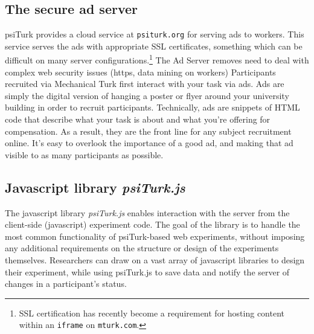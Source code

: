 \documentclass[twocolumn]{svjour3}          %
\begin{document}
\subsection{The secure ad server}

\textsf{psiTurk} provides a cloud service at \texttt{psiturk.org} for serving ads to workers.
This service serves the ads with appropriate SSL certificates, something which can be difficult on many server configurations.\footnote{SSL certification has recently become a requirement for hosting content within an \texttt{iframe} on \texttt{mturk.com}.}
The Ad Server removes need to deal with complex web security issues (https, data mining on workers) 
Participants recruited via Mechanical Turk first interact with your task via ads. Ads are simply the digital version of hanging a poster or flyer around your university building in order to recruit participants. Technically, ads are snippets of HTML code that describe what your task is about and what you're offering for compensation. As a result, they are the front line for any subject recruitment online. It's easy to overlook the importance of a good ad, and making that ad visible to as many participants as possible.





%
%
%
%
%



\subsection{Javascript library \emph{psiTurk.js}}

The javascript library \emph{psiTurk.js} enables interaction with the server from the client-side (javascript) experiment code.
The goal of the library is to handle the most common functionality of psiTurk-based web experiments, without imposing any additional requirements on the structure or design of the experiments themselves.
Researchers can draw on a vast array of javascript libraries to design their experiment, while using psiTurk.js to save data and notify the server of changes in a participant's status.
\end{document}
